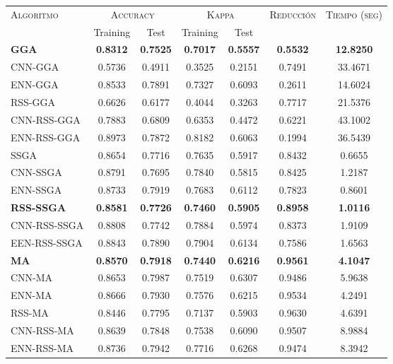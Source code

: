 \begin{table}[h!]
\centering
\begin{tabular}{l c c c c c c}
\hline
\multirow{2}{*}{\textsc{Algoritmo}}
	& \multicolumn{2}{c}{\textsc{Accuracy}}
	& \multicolumn{2}{c}{\textsc{Kappa}}
	& \textsc{Reducción}
	& \textsc{Tiempo (seg)} \\
	& Training & Test
	& Training & Test \\ 
\hline
\hline

\textbf{GGA}         & \textbf{0.8312} & \textbf{0.7525} & \textbf{0.7017} & \textbf{0.5557} & \textbf{0.5532} & \textbf{12.8250} \\
CNN-GGA     & 0.5736 & 0.4911 & 0.3525 & 0.2151 & 0.7491 & 33.4671 \\
ENN-GGA     & 0.8533 & 0.7891 & 0.7327 & 0.6093 & 0.2611 & 14.6024 \\
RSS-GGA     & 0.6626 & 0.6177 & 0.4044 & 0.3263 & 0.7717 & 21.5376 \\
CNN-RSS-GGA & 0.7883 & 0.6809 & 0.6353 & 0.4472 & 0.6221 & 43.1002 \\
ENN-RSS-GGA & 0.8973 & 0.7872 & 0.8182 & 0.6063 & 0.1994 & 36.5439 \\

\hline

SSGA & 0.8654 & 0.7716 & 0.7635 & 0.5917 & 0.8432 & 0.6655 \\
CNN-SSGA & 0.8791 & 0.7695 & 0.7840 & 0.5815 & 0.8425 & 1.2187 \\
ENN-SSGA & 0.8733 & 0.7919 & 0.7683 & 0.6112 & 0.7823 & 0.8601 \\
\textbf{RSS-SSGA} & \textbf{0.8581} & \textbf{0.7726} & \textbf{0.7460} & \textbf{0.5905} & \textbf{0.8958} &\textbf{1.0116} \\
CNN-RSS-SSGA & 0.8808 & 0.7742 & 0.7884 & 0.5974 & 0.8373 & 1.9109 \\
EEN-RSS-SSGA & 0.8843 & 0.7890 & 0.7904 & 0.6134 & 0.7586 & 1.6563 \\

\hline

\textbf{MA}   & \textbf{0.8570} & \textbf{0.7918} & \textbf{0.7440} & \textbf{0.6216} & \textbf{0.9561} & \textbf{4.1047} \\
CNN-MA & 0.8653 & 0.7987 & 0.7519 & 0.6307 & 0.9486 & 5.9638 \\
ENN-MA & 0.8666 & 0.7930 & 0.7576 & 0.6215 & 0.9534 & 4.2491 \\
RSS-MA & 0.8446 & 0.7795 & 0.7137 & 0.5903 & 0.9630 & 4.6391 \\
CNN-RSS-MA  & 0.8639 & 0.7848 & 0.7538 & 0.6090 & 0.9507 & 8.9884 \\
ENN-RSS-MA & 0.8736 & 0.7942 & 0.7716 & 0.6268 & 0.9474 & 8.3942 \\


\end{tabular}
\end{table}
